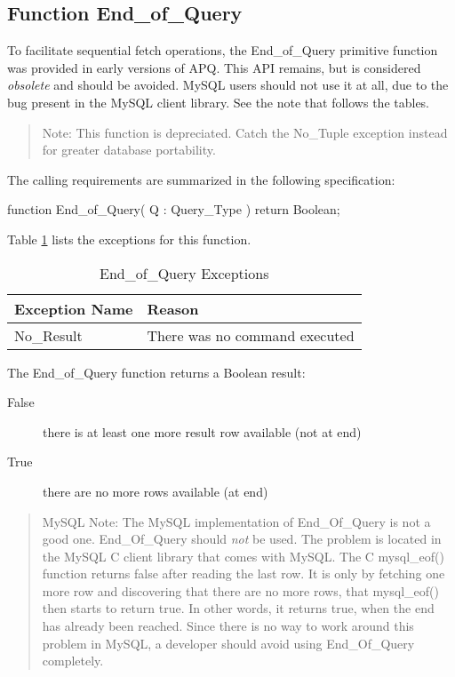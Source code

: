 \documentclass[english,letterpaper]{book}
\begin{document}
\subsection{Function End\_of\_Query\label{End_of_Query}}

To facilitate sequential
fetch operations, the End\_of\_Query primitive function was provided in
early versions of APQ. This API remains, but is considered
\emph{obsolete} and should be avoided. MySQL users should not use it at
all, due to the bug present in the MySQL client library. See the note
that follows the tables.

\begin{quote}
Note: This function is depreciated. Catch the No\_Tuple exception
instead for greater database portability.
\end{quote}

The calling requirements are summarized in the following specification:

\begin{Code}
function End_of_Query(
   Q : Query_Type
) return Boolean;
\end{Code}

Table \ref{t:eoqx} lists the exceptions for this function.

\begin{table}
   \begin{center}
      \begin{tabular}{ll}
         Exception Name    &  Reason\\
         \hline 
         No\_Result        &  There was no command executed\\
      \end{tabular}
   \end{center}
   \caption{End\_of\_Query Exceptions}\label{t:eoqx}
\end{table}

The End\_of\_Query function returns a Boolean result:

\begin{description}
   \item [False] there is at least one more result row available (not at end)
   \item [True] there are no more rows available (at end)
\end{description}

\begin{quote}
MySQL Note: 
The MySQL implementation of End\_Of\_Query is not a good
one. End\_Of\_Query should \emph{not} be used. The problem is located
in the MySQL C client library that comes with MySQL. The C mysql\_eof()
function returns false after reading the last row. It is only by fetching
one more row and discovering that there are no more rows, that mysql\_eof()
then starts to return true. In other words, it returns true, when
the end has already been reached. Since there is no way to work around
this problem in MySQL, a developer should avoid using End\_Of\_Query
completely.
\end{quote}
\end{document}
